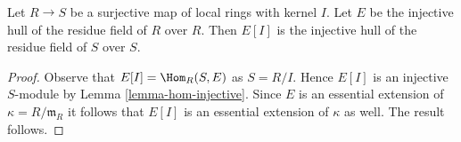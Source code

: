\begin{lemma}
\label{lemma-quotient}
Let $R \to S$ be a surjective map of local rings with kernel $I$.
Let $E$ be the injective hull of the residue field of $R$ over $R$.
Then $E[I]$ is the injective hull of the residue field of $S$ over $S$.
\end{lemma}

\begin{proof}
Observe that $E[I] = \Hom_R(S, E)$ as $S = R/I$. Hence $E[I]$ is an injective
$S$-module by Lemma \ref{lemma-hom-injective}. Since $E$ is an essential
extension of $\kappa = R/\mathfrak m_R$ it follows that $E[I]$ is an
essential extension of $\kappa$ as well. The result follows.
\end{proof}
